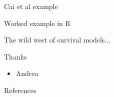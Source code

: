 \documentclass[aspectratio=169,12pt]{beamer} %
\begin{document}
\begin{frame}{Cai et al example}
\end{frame}

\begin{frame}{Worked example in R}
\end{frame}

\begin{frame}{The wild west of survival models...}
\end{frame}

\begin{frame}{Thanks}
    \begin{itemize}
        \item Andrea
    \end{itemize}
\end{frame}

\begin{frame}{References}
%        
%        
        \tiny
        
\end{frame}
\end{document}
